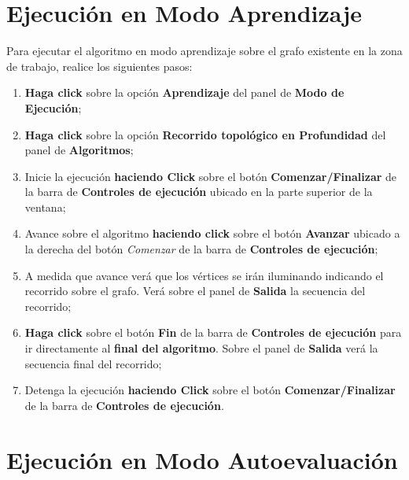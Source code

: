 \documentclass{book}
\begin{document}
\section{Ejecución en Modo Aprendizaje}

Para ejecutar el algoritmo en modo aprendizaje sobre el grafo existente en la zona de trabajo, realice los siguientes pasos:
\medskip

\begin{enumerate}
	\itemsep=8pt \topsep=0pt \partopsep=0pt \parskip=0pt \parsep=0pt

	\item \textbf{Haga click} sobre la opción \textbf{Aprendizaje} del panel de \textbf{Modo de Ejecución};

	\item \textbf{Haga click} sobre la opción \textbf{Recorrido topológico en Profundidad} del panel de \textbf{Algoritmos};

	\item Inicie la ejecución \textbf{haciendo Click} sobre el botón \textbf{Comenzar/Finalizar} de la barra de \textbf{Controles de ejecución} ubicado en la parte superior de la ventana;

	\item Avance sobre el algoritmo \textbf{haciendo click} sobre el botón \textbf{Avanzar} ubicado a la derecha del botón \textit{Comenzar} de la barra de \textbf{Controles de ejecución};

	\item A medida que avance verá que los vértices se irán iluminando indicando el recorrido sobre el grafo. Verá sobre el panel de \textbf{Salida} la secuencia del recorrido;

	\item \textbf{Haga click} sobre el botón \textbf{Fin} de la barra de \textbf{Controles de ejecución} para ir directamente al \textbf{final del algoritmo}. Sobre el panel de \textbf{Salida} verá la secuencia final del recorrido;

	\item Detenga la ejecución \textbf{haciendo Click} sobre el botón \textbf{Comenzar/Finalizar} de la barra de \textbf{Controles de ejecución}.

\end{enumerate}
\medskip



\section{Ejecución en Modo Autoevaluación}
\end{document}
